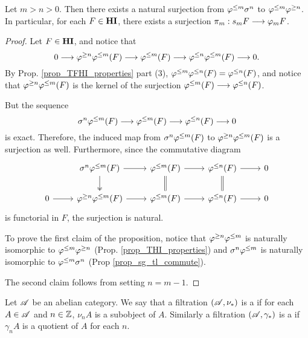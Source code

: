 \begin{prop}\label{prop_struct_consts}
Let $m > n > 0$. Then there exists a natural surjection from 
$\varphi^{\leq m} \sigma^{n}$ to $\varphi^{\leq m} \varphi^{\geq n}$. In particular, for 
each $F \in \mathbf{HI}$, there exists a surjection $\pi_m: s_m F \longrightarrow 
\varphi_{m} F$.
\end{prop}
\begin{proof}
Let $F \in \mathbf{HI}$, and notice that
\[
0 \longrightarrow \varphi^{\geq n} \varphi^{\leq m}(F) \longrightarrow \varphi^{\leq m}(F) \longrightarrow 
  \varphi^{\leq n} \varphi^{\leq m}(F) \longrightarrow 0.
\]
By Prop. \ref{prop_TFHI_properties} part (3), $\varphi^{\leq m} \varphi^{\leq n}(F) 
= \varphi^{\leq n}(F)$, and notice that $\varphi^{\geq n} \varphi^{\leq m}(F)$ is the kernel 
of the surjection $\varphi^{\leq m}(F) \longrightarrow \varphi^{\leq n}(F)$.

But the sequence
\[
\sigma^{n} \varphi^{\leq m}(F) \longrightarrow \varphi^{\leq m}(F) \longrightarrow \varphi^{\leq n}(F) \longrightarrow 0
\]
is exact. Therefore, the induced map from $\sigma^{n} \varphi^{\leq m}(F)$
to $\varphi^{\geq n} \varphi^{\leq m}(F)$ is a surjection as well. Furthermore,
since the commutative diagram
\[
\begin{tikzcd}
{} & \sgHI{n} \tlHI{m}(F) \arrow{r} \arrow[twoheadrightarrow]{d} &
\tlHI{m}(F) \arrow{r} \arrow[equal]{d} &
\tlHI{n}(F) \arrow{r} \arrow[equal]{d} &
0 \\
0 \arrow{r} &
\tgHI{n} \tlHI{m}(F) \arrow{r} &
\tlHI{m}(F) \arrow{r} &
\tlHI{n}(F) \arrow{r} &
0
\end{tikzcd}
\] 
is functorial in $F$, the surjection is natural.

To prove the first claim of the proposition, notice that 
$\varphi^{\geq n} \varphi^{\leq m}$ is naturally isomorphic to $\varphi^{\leq m} \varphi^{\geq n}$ 
(Prop. \ref{prop_THI_properties}) and $\sigma^{n} \varphi^{\leq m}$ is 
naturally isomorphic to $\varphi^{\leq m} \sigma^{n}$ (Prop 
\ref{prop_sg_tl_commute}).

The second claim follows from setting $n = m - 1$.
\end{proof}


\begin{defn}
Let $\mathscr{A}$ be an abelian category. We say that a filtration 
$(\mathscr{A}, \nu_*)$ is a  if for each $A 
\in \mathscr{A}$ and $n \in \mathbb{Z}$, $\nu_n A$ is a subobject of $A$. 
Similarly a filtration $(\mathscr{A}, \gamma_*)$ is a  if $\gamma_n A$ is a quotient of $A$ for each $n$.
\end{defn}
